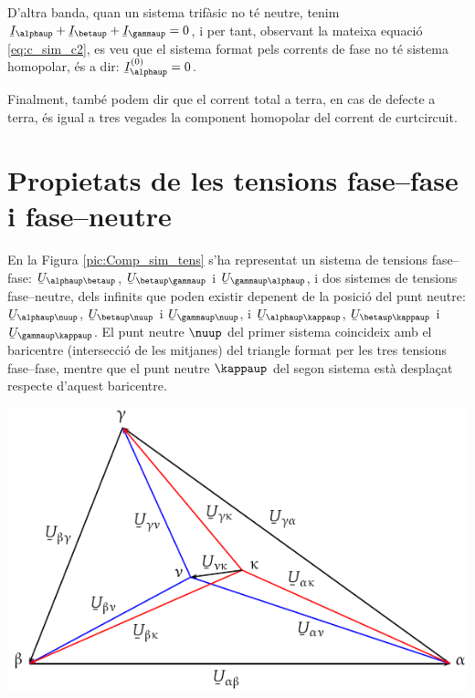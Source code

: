 D'altra banda, quan un sistema trif\`{a}sic no t\'{e} neutre, tenim
$\cmplx{I}_\alphaup+ \cmplx{I}_\betaup+\cmplx{I}_\gammaup=0$, i per tant,
observant la mateixa equaci\'{o} \eqref{eq:c_sim_c2}, es veu que el
sistema format pels corrents de fase no t\'{e} sistema homopolar, \'{e}s a dir: $\cmplx{I}_\alphaup\ap{(0)}=0$.

Finalment, tamb\'{e} podem dir que el corrent total a terra, en cas de
defecte a terra, \'{e}s igual a tres vegades la component homopolar del
corrent de curtcircuit.

\section{Propietats de les tensions fase--fase i fase--neutre}\label{sec:comp-sim-neutre}
 

En la Figura \vref{pic:Comp_sim_tens} s'ha representat un sistema de
tensions fase--fase: $\cmplx{U}_{\alphaup\betaup}$,
$\cmplx{U}_{\betaup\gammaup}$ i $\cmplx{U}_{\gammaup\alphaup}$, i dos
sistemes de tensions fase--neutre, dels infinits que poden existir
depenent de la posici\'{o} del punt neutre: $\cmplx{U}_{\alphaup\nuup}$,
$\cmplx{U}_{\betaup\nuup}$ i $\cmplx{U}_{\gammaup\nuup}$, i
$\cmplx{U}_{\alphaup\kappaup}$, $\cmplx{U}_{\betaup\kappaup}$ i
$\cmplx{U}_{\gammaup\kappaup}$. El punt neutre $\nuup$ del primer sistema
coincideix amb el baricentre (intersecci\'{o} de les mitjanes) del
triangle  format per les tres tensions fase--fase, mentre que el
punt neutre $\kappaup$ del segon sistema est\`{a} despla\c{c}at respecte
d'aquest baricentre.

\begin{center}
    \includegraphics{Imatges/Cap-CompSim-Tensions.pdf}
    \label{pic:Comp_sim_tens}
\end{center}


